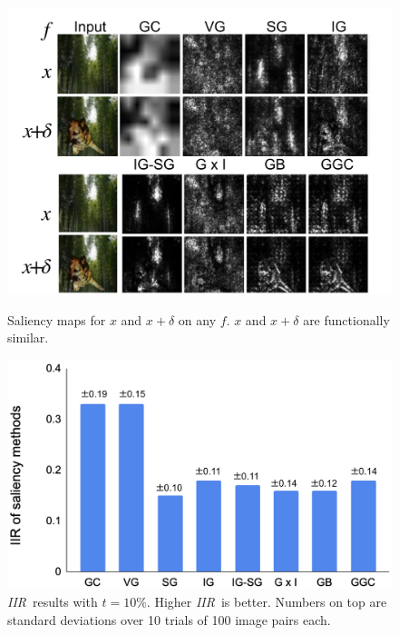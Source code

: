 \documentclass[twoside]{article}
\newcommand{\IIR}{\textit{IIR}}
\begin{document}
\begin{figure}[h!]
\centering
\begin{minipage}{.48\textwidth}
  \centering
  \includegraphics[width=1.\linewidth]{figures/ii_demo.jpg}
  \caption{Saliency maps for $x$ and $x+\delta$ on any $f$. $x$ and $x+\delta$ are functionally similar.}
  \label{fig:ii_demo}
\end{minipage}
  \hfill
\begin{minipage}{.48\textwidth}
  \centering
  \includegraphics[width=1.\linewidth]{figures/ii_bar.jpg}
  \caption{\IIR~results with $t=10\%$. Higher \IIR~is better. Numbers on top are standard deviations over 10 trials of 100 image pairs each.}
  \label{fig:ii_bar}
\end{minipage}
\end{figure}
\end{document}
